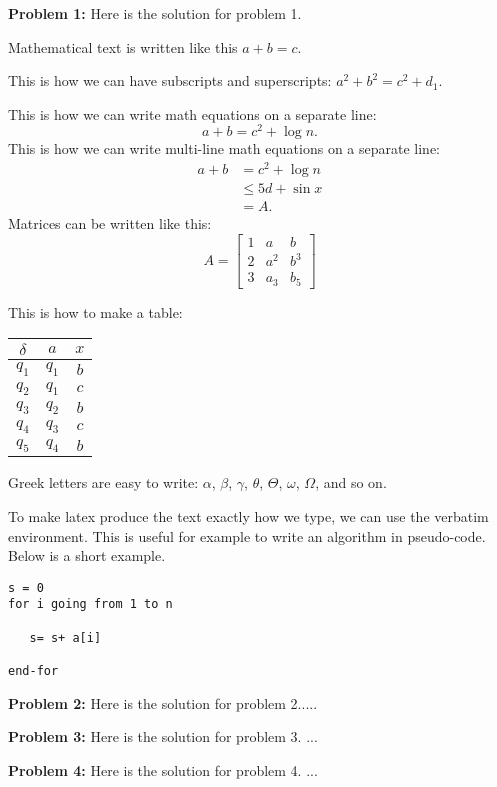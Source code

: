\documentclass[12pt,letterpaper,final]{report}
\begin{document}

\vline


\noindent\textbf{Problem 1:}  Here is the solution for problem 1.

Mathematical text is written like this $a+b = c$.

This is how we can have subscripts and superscripts: $a^2 + b^2 = c^2 + d_1$.

This is how we can write math equations on a separate line:
\[
a+b = c^2 + \log n.
\]
This is how we can write multi-line math equations on a separate line:
\[
\begin{array}{ll}
a+b & = c^2 + \log n \\
&\leq 5d + \sin x \\
& = A.
\end{array}
\]
Matrices can be written like this:
\[
A = 
\begin{bmatrix}
1 & a & b \\
2 & a^2 & b^3 \\
3 & a_3 & b_5
\end{bmatrix}
\]
\smallskip

This is how to make a table:
\medskip

\begin{tabular}{|c|c|c|}
\hline
$\delta$ & $a$ & $x$ \\
\hline
$q_{1}$ & $q_{1}$ & $ b$ \\
$q_{2}$ & $q_{1}$ & $ c$ \\
$q_{3}$ & $q_{2}$ & $ b$ \\
$q_{4}$ & $q_{3}$ & $ c$ \\
$q_{5}$ & $q_{4}$ & $ b$ \\
\hline
\end{tabular}
\medskip

Greek letters are easy to write: $\alpha$, $\beta$, $\gamma$, $\theta$, $\Theta$, $\omega$, $\Omega$, and so on. 
\bigskip

To make latex produce the text exactly how we type, we can use the verbatim environment. This is useful for example to write an algorithm in pseudo-code. Below is a short example.

\begin{verbatim}
s = 0
for i going from 1 to n

   s= s+ a[i]

end-for
\end{verbatim}
\noindent\textbf{Problem 2:} Here is the solution for problem 2.....





\bigskip

\noindent\textbf{Problem 3:} Here is the solution for problem 3. ...


\bigskip

\noindent\textbf{Problem 4:}  Here is the solution for problem 4. ...
\end{document}
